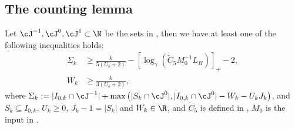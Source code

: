 \subsection{The counting lemma}\label{sec:proof-counting-lemma}

\begin{lemma}
    \label{lem:basic-counting-lemma}
    Let $\cJ^{-1}, \cJ^0, \cJ^1 \subset \N$ be the sets in , then we have
    at least one of the following inequalities holds:
    \begin{align}
        \label{eqn:basic-counting-lemma-loss-descent}
        \Sigma_k &\geq 
        \frac{k}{5(U_k+2)} - [\log_\gamma (\tilde C_5 M_0^{-1} L_H)]_+ - 2, \\
        \label{eqn:basic-counting-lemma-gradient-descent}
        W_k&\geq \frac{k}{3(U_k+2)},
    \end{align}
    where $\Sigma_k := |I_{0,k} 
    \cap \cJ^{-1}| + \max\left( |S_k \cap \cJ^0|, |I_{0,k}
    \cap\cJ^0| - W_k - U_kJ_k \right)$, and $S_k \subseteq I_{0,k}$, 
    $U_k \geq 0$, $J_k -1 = |S_k|$ and $W_k \in \R$, and $\tilde C_5$ is defined in , $M_0$ is the input in .
\end{lemma}
